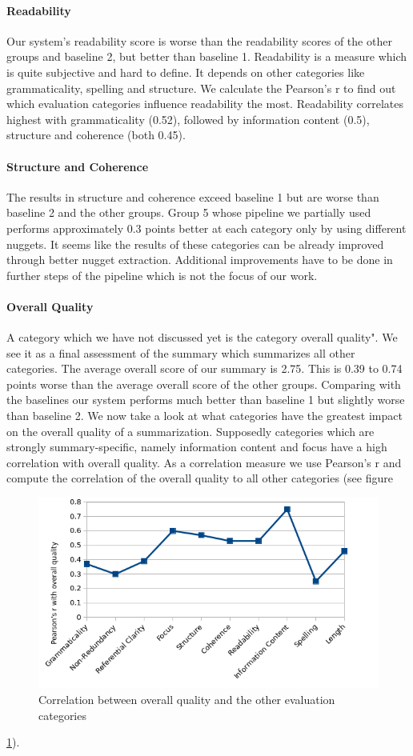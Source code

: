 \paragraph{Readability}
Our system's readability score is worse than the readability scores of the other groups and baseline 2, but better than baseline 1. Readability is a measure which is quite subjective and hard to define. It depends on other categories like grammaticality, spelling and structure. We calculate the Pearson's r to find out which evaluation categories influence readability the most. Readability correlates highest with grammaticality (0.52), followed by information content (0.5), structure and coherence (both 0.45).   

\paragraph{Structure and Coherence}
The results in structure and coherence exceed baseline 1 but are worse than baseline 2 and the other groups. Group 5 whose pipeline we partially used performs approximately 0.3 points better at each category only by using different nuggets. It seems like the results of these categories can be already improved through better nugget extraction. Additional improvements have to be done in further steps of the pipeline which is not the focus of our work.

\paragraph{Overall Quality}
A category which we have not discussed yet is the category overall quality". We see it as a final assessment of the summary which summarizes all other categories. The average overall score of our summary is 2.75. This is 0.39 to 0.74 points worse than the average overall score of the other groups. Comparing with the baselines our system performs much better than baseline 1 but slightly worse than baseline 2. We now take a look at what categories have the greatest impact on the overall quality of a summarization. Supposedly categories which are strongly summary-specific, namely information content and focus have a high correlation with overall quality. As a correlation measure we use Pearson's r and compute the correlation of the overall quality to all other categories (see figure 
\begin{figure}
	\centering
	\label{fig:corr_overall_quality}
	\caption{Correlation between overall quality and the other evaluation categories}
	\includegraphics[width=0.8\linewidth]{figures/correlation_overall_quality.png}
\end{figure}
\ref{fig:corr_overall_quality}).


